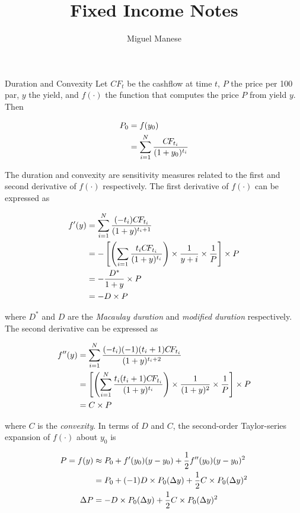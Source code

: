 \documentclass{article}
\title{Fixed Income Notes}
\author{Miguel Manese}
\date{}
\newcommand{\CF}{C\!F}
\begin{document}
\maketitle

\begin{section}{Duration and Convexity}
Let $\CF_t$ be the cashflow at time $t$, $P$ the price per 100 par, $y$ the
yield, and $f(\cdot)$ the function that computes the price $P$ from yield
$y$. Then

\begin{align}
P_0 &= f(y_0) \notag\\
  &= \sum_{i=1}^N \frac{\CF_{t_{i}}}{(1 + y_0)^{t_{i}}} \notag
\end{align}

The duration and convexity are sensitivity measures related to the first
and second derivative of $f(\cdot)$ respectively. The first derivative of
$f(\cdot)$ can be expressed as

\begin{align}
f'(y) &= \sum_{i=1}^N \frac{(- t_i) \CF_{t_{i}}}{(1 + y)^{t_i + 1}} \notag\\
      &= - \left[\left(\sum_{i=1} \frac{t_i \CF_{t_{i}}}{(1 + y)^{t_i}} \right)
        \times \frac{1}{y + i} \times \frac{1}{P}\right] \times P \notag\\
      &= - \frac{D^*}{1 + y} \times P \notag\\
      &= - D \times P \notag
\end{align}

\noindent where $D^{*}$ and $D$ are the \emph{Macaulay duration} and 
\emph{modified duration} respectively. The second derivative can be expressed
as

\begin{align}
f''(y) &= \sum_{i=1}^N \frac{(- t_i) (-1)(t_i + 1) 
   \CF_{t_{i}}}{(1 + y)^{t_i + 2}} \notag\\
      &= \left[\left(\sum_{i=1}^N \frac{t_i (t_i + 1) \CF_{t_{i}}}{(1 + y)^{t_i}}
        \right) \times \frac{1}{(1 + y)^2} \times \frac{1}{P}\right]
        \times P \notag\\
      &= C \times P \notag
\end{align}

\noindent where $C$ is the \emph{convexity}. In terms of $D$ and $C$, the
second-order Taylor-series expansion of $f(\cdot)$ about $y_0$ is

\begin{align}
P = f(y) &\approx P_0 + f'(y_0) (y - y_0) + \frac{1}{2} f''(y_0) (y - y_0)^2
  \notag\\
     &= P_0 + (-1) D \times P_0 (\Delta y) + 
        \frac{1}{2} C \times P_0 (\Delta y)^2 \notag\\
\Delta P &= - D \times P_0 (\Delta y) + \frac{1}{2} C \times P_0 (\Delta y)^2
  \notag
\end{align}


\end{section}
\end{document}
